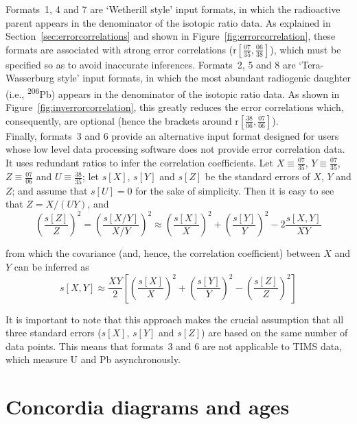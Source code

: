 \begin{refsection}
Formats~1, 4 and 7 are `Wetherill style' input formats, in which the
radioactive parent appears in the denominator of the isotopic ratio
data. As explained in Section~\ref{sec:errorcorrelations} and shown in
Figure~\ref{fig:errorcorrelation}, these formats are associated with
strong error correlations
(r$\left[\frac{07}{35},\frac{06}{38}\right]$), which must be specified
so as to avoid inaccurate inferences.  Formats~2, 5 and 8 are
`Tera-Wasserburg style' input formats, in which the most abundant
radiogenic daughter (i.e., \textsuperscript{206}Pb) appears in the
denominator of the isotopic ratio data.  As shown in
Figure~\ref{fig:inverrorcorrelation}, this greatly reduces the error
correlations which, consequently, are optional (hence the brackets
around r$\left[\frac{38}{06},\frac{07}{06}\right]$).\\

Finally, formats~3 and 6 provide an alternative input format designed
for users whose low level data processing software does not provide
error correlation data. It uses redundant ratios to infer the
correlation coefficients. Let $X \equiv \frac{07}{35}$, $Y \equiv
\frac{07}{35}$, $Z \equiv \frac{07}{06}$ and $U \equiv \frac{38}{35}$;
let $s[X]$, $s[Y]$ and $s[Z]$ be the standard errors of $X$, $Y$ and
$Z$; and assume that $s[U]=0$ for the sake of simplicity. Then it is
easy to see that $Z = X/(U Y)$, and
\begin{equation}
  \left(\frac{s[Z]}{Z}\right)^2 = \left(\frac{s[X/Y]}{X/Y}\right)^2
  \approx \left(\frac{s[X]}{X}\right)^2 + \left(\frac{s[Y]}{Y}\right)^2 -
  2 \frac{s[X,Y]}{XY}
\end{equation}

\noindent from which the covariance (and, hence, the correlation
coefficient) between $X$ and $Y$ can be inferred as
\begin{equation}
  s[X,Y] \approx \frac{XY}{2}
  \left[
    \left(\frac{s[X]}{X}\right)^2 +
    \left(\frac{s[Y]}{Y}\right)^2 -
    \left(\frac{s[Z]}{Z}\right)^2
    \right]
  \label{eq:redundantratios}
\end{equation}

It is important to note that this approach makes the crucial
assumption that all three standard errors ($s[X]$, $s[Y]$ and $s[Z]$)
are based on the same number of data points. This means that formats~3
and 6 are not applicable to TIMS data, which measure U and Pb
asynchronously.

\section{Concordia diagrams and ages}
\label{sec:concordia}


\end{refsection}
